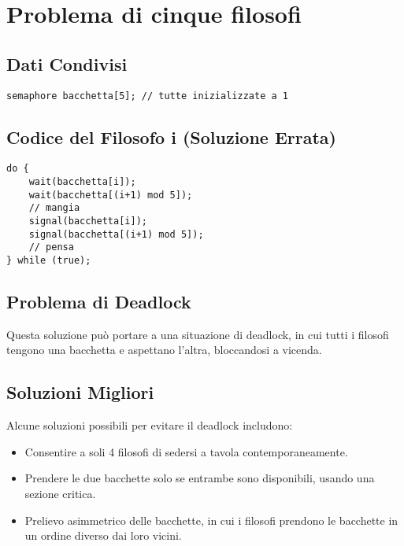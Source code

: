 

\section{Problema di cinque filosofi}
\subsection{Dati Condivisi}
\begin{verbatim}
semaphore bacchetta[5]; // tutte inizializzate a 1
\end{verbatim}

\subsection{Codice del Filosofo i (Soluzione Errata)}

\begin{verbatim}
do {
    wait(bacchetta[i]);
    wait(bacchetta[(i+1) mod 5]);
    // mangia
    signal(bacchetta[i]);
    signal(bacchetta[(i+1) mod 5]);
    // pensa
} while (true);
\end{verbatim}

\subsection{Problema di Deadlock}
Questa soluzione può portare a una situazione di deadlock, in cui tutti i filosofi tengono una bacchetta e aspettano l'altra, bloccandosi a vicenda.

\subsection{Soluzioni Migliori}
Alcune soluzioni possibili per evitare il deadlock includono:
\begin{itemize}
    \item Consentire a soli 4 filosofi di sedersi a tavola contemporaneamente.
    \item Prendere le due bacchette solo se entrambe sono disponibili, usando una sezione critica.
    \item Prelievo asimmetrico delle bacchette, in cui i filosofi prendono le bacchette in un ordine diverso dai loro vicini.
\end{itemize}



